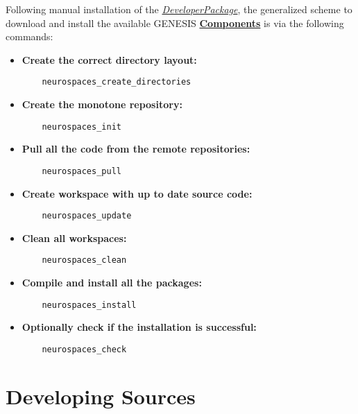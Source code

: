 \documentclass[12pt]{article}
\begin{document}
Following manual installation of the \href{../developer-package/developer-package.tex}{\it DeveloperPackage}, the generalized scheme to download and install the available GENESIS \href{../reserved-words/reserved-words.tex}{\bf Components} is via the following commands:

\begin{itemize}
\item {\bf Create the correct directory layout:}
\begin{verbatim}
	neurospaces_create_directories
\end{verbatim}
  
\item {\bf Create the monotone repository:}
\begin{verbatim}
	neurospaces_init
\end{verbatim}

\item {\bf Pull all the code from the remote repositories:}
\begin{verbatim}
	neurospaces_pull
\end{verbatim}

\item {\bf Create workspace with up to date source code:}
\begin{verbatim}
	neurospaces_update
\end{verbatim}

\item {\bf Clean all workspaces:}
\begin{verbatim}
	neurospaces_clean
\end{verbatim}

\item {\bf Compile and install all the packages:}
\begin{verbatim}
	neurospaces_install
\end{verbatim}

\item {\bf Optionally check if the installation is successful:}
\begin{verbatim}
	neurospaces_check
\end{verbatim}

\end{itemize}

\section*{Developing Sources}

\end{document}
